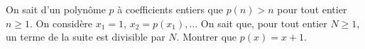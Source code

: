 On sait d'un polynôme $p$ à coefficients entiers que $p(n) > n$ pour tout entier $n \geq 1$. On considère $x_1 = 1$, $x_2 = p(x_1), \ldots$ On sait que, pour tout entier $N \geq 1$, un terme de la suite est divisible par $N$. Montrer que $p(x) = x + 1$.
